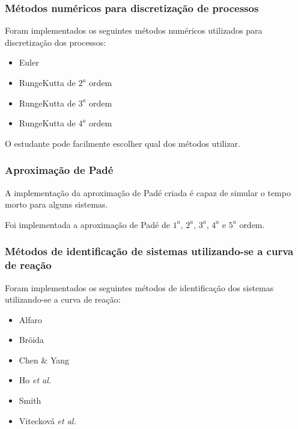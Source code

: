         \subsubsection{Métodos numéricos para discretização de processos}

            Foram implementados os seguintes métodos numéricos utilizados para discretização dos processos:

            \begin{itemize}
                \item Euler
                \item RungeKutta de $2^a$ ordem
                \item RungeKutta de $3^a$ ordem
                \item RungeKutta de $4^a$ ordem
            \end{itemize}

            O estudante pode facilmente escolher qual dos métodos utilizar.

        \subsubsection{Aproximação de Padé}
            
            A implementação da aproximação de Padé criada é capaz de simular o tempo morto
            para alguns sistemas.

            Foi implementada a aproximação de Padé de $1^a$, $2^a$, $3^a$, $4^a$ e $5^a$ ordem.

        \subsubsection{Métodos de identificação de sistemas utilizando-se a curva de reação}
            
            Foram implementados os seguintes métodos de identificação dos sistemas utilizando-se
            a curva de reação:

            \begin{itemize}
                \item Alfaro
                \item Bröida
                \item Chen \& Yang
                \item Ho \textit{et al.}
                \item Smith
                \item Vitecková \textit{et al.}
            \end{itemize}

